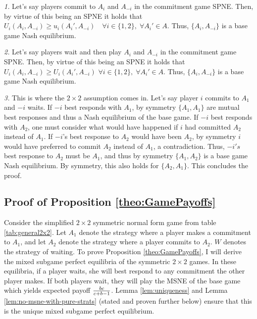 \documentclass[../paper.tex]{subfiles}
\begin{document}
\textit{1.} Let's say players commit to $A_i$ and $A_{-i}$ in the commitment game SPNE. Then, by virtue of this being an SPNE it holds that $U_i(A_i,A_{-i})\geq u_i(A_i',A_{-i})\quad \forall i\in\{1,2\},\; \forall A_i'\in A$. Thus, $\{A_i,A_{-i}\}$ is a base game Nash equilibrium.
 
\textit{2.} Let's say players wait and then play $A_i$ and $A_{-i}$ in the commitment game SPNE. Then, by virtue of this being an SPNE it holds that $U_i(A_i,A_{-i})\geq U_i(A_i',A_{-i})$ $\forall i\in\{1,2\},\; \forall A_i'\in A$. Thus, $\{A_i,A_{-i}\}$ is a base game Nash equilibrium.
 
\textit{3.} This is where the $2\times2$ assumption comes in. Let's say player $i$ commits to $A_1$ and $-i$ waits. If $-i$ best responds with $A_1$,  by symmetry $\{A_1,A_1\}$ are mutual best responses and thus a Nash equilibrium of the base game. If $-i$ best responds with $A_2$, one must consider what would have happened if $i$ had committed $A_2$ instead of $A_1$. If $-i$'s best response to $A_2$ would have been $A_2$, by symmetry $i$ would have preferred to commit $A_2$ instead of $A_1$, a contradiction. Thus, $-i's$ best response to $A_2$ must be $A_1$, and thus by symmetry $\{A_1,A_2\}$ is a base game Nash equilibrium. By symmetry, this also holds for $\{A_2,A_1\}$. This concludes the proof.
 
\subsection{Proof of Proposition \ref{theo:GamePayoffs}}\label{sec:prooftheo1}
Consider the simplified $2\times2$ symmetric normal form game from table \ref{tab:general2x2}. Let $A_{1}$ denote the strategy where a player makes a commitment to $A_1$, and let $A_{2}$ denote the strategy where a player commits to $A_2$. $W$ denotes the strategy of waiting. 
To prove Proposition \ref{theo:GamePayoffs}, I will derive the mixed subgame perfect equilibria of the symmetric $2\times2$ games. In these equilibria, if a player waits, she will best respond to any commitment the other player makes. If both players wait, they will play the MSNE of the base game which yields expected payoff $\tfrac{bc}{c+b-1}$. 
Lemma \ref{lem:uniqueness} and Lemma \ref{lem:no-msne-with-pure-strats} (stated and proven further below) ensure that this is the unique mixed subgame perfect equilibrium. 
 
\end{document}
